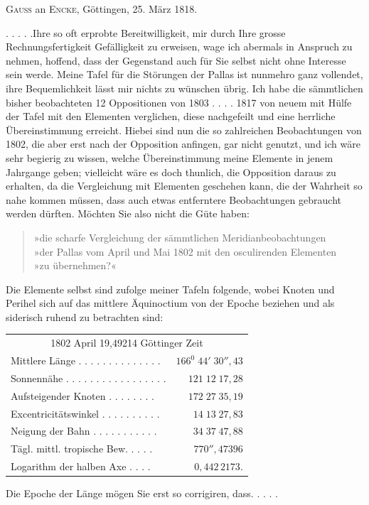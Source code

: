 \par{}\bigskip
\begin{center}
\textsc{Gauss} an \textsc{Encke}, Göttingen, 25. März 1818.
\end{center}
\noindent\hspace*{\parindent}. . . . .\quad Ihre so oft erprobte Bereitwilligkeit, mir durch Ihre grosse Rechnungsfertigkeit Gefälligkeit zu erweisen, wage ich abermals in Anspruch zu nehmen, hoffend, dass der Gegenstand auch für Sie selbst nicht ohne Interesse sein werde. Meine Tafel für die Störungen der Pallas ist nunmehro ganz vollendet, ihre Bequemlichkeit lässt mir nichts zu wünschen übrig. Ich habe die sämmtlichen bisher beobachteten 12 Oppositionen von 1803 . . . . 1817 von neuem mit Hülfe der Tafel mit den Elementen verglichen, diese nachgefeilt und eine herrliche Übereinstimmung erreicht. Hiebei sind nun die so zahlreichen Beobachtungen von 1802, die aber erst nach der Opposition anfingen, gar nicht genutzt, und ich wäre sehr begierig zu wissen, welche Übereinstimmung meine Elemente in jenem Jahrgange geben; vielleicht wäre es doch thunlich, die Opposition daraus zu erhalten, da die Vergleichung mit Elementen geschehen kann, die der Wahrheit so nahe kommen müssen, dass auch etwas entferntere Beobachtungen gebraucht werden dürften. Möchten Sie also nicht die Güte haben:
\begin{quote}
»die scharfe Vergleichung der sämmtlichen Meridianbeobachtungen\\
»der Pallas vom April und Mai 1802 mit den osculirenden Elementen\\
»zu übernehmen?«
\end{quote}
\par Die Elemente selbst sind zufolge meiner Tafeln folgende, wobei Knoten und Perihel sich auf das mittlere Äquinoctium von der Epoche beziehen und als siderisch ruhend zu betrachten sind:
\begin{center}
\begingroup\small\setlength{\tabcolsep}{4pt}
\begin{tabular}{@{}lr@{}}
\multicolumn{2}{c}{1802 April 19,49214 Göttinger Zeit}\\[3pt]
Mittlere Länge . . . . . . . . . . . . . .&\(166^0\;44'\;30''{,}43\)\\
Sonnennähe . . . . . . . . . . . . . . . . .&\(121\;12\;17{,}28\)\\
Aufsteigender Knoten . . . . . . . .&\(172\;27\;35{,}19\)\\
Excentricitätswinkel . . . . . . . . . .&\(14\;13\;27{,}83\)\\
Neigung der Bahn . . . . . . . . . . .&\(34\;37\;47{,}88\)\\
Tägl. mittl. tropische Bew. . . . .&\(770''{,}47396\)\\
Logarithm der halben Axe . . . .&\(0{,}442\,2173.\)
\end{tabular}
\endgroup
\end{center}
\noindent Die Epoche der Länge mögen Sie erst so corrigiren, dass\quad . . . . .
\par
